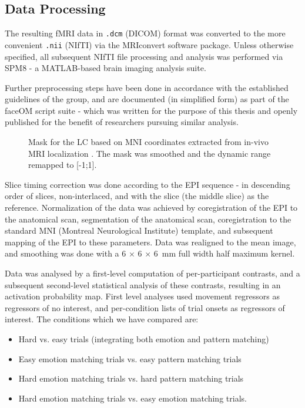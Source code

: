 	\subsection{Data Processing}\label{sec:m_fmri_dp}
	    The resulting fMRI data in \colorbox{vlg}{\texttt{.dcm}} (DICOM) format was converted to the more convenient \colorbox{vlg}{\texttt{.nii}} (NIfTI) via the MRIconvert \citep{MRIconvert} software package.
	    Unless otherwise specified, all subsequent NIfTI file processing and analysis was performed via SPM8 \citep{spm} - a MATLAB\textsuperscript{\small\textregistered}-based brain imaging analysis suite.
	    
	    Further preprocessing steps have been done in accordance with the established guidelines of the group, and are documented (in simplified form) as part of the faceOM script suite \citep{faceOM} - which was written for the purpose of this thesis and openly published for the benefit of researchers pursuing similar analysis.
	    
	    \begin{wrapfigure}{r}{0.55\textwidth}
		\centering
		\vspace{-0.7cm}
		\caption{Mask for the LC based on MNI coordinates extracted from in-vivo MRI localization \citep{Keren2009}. The mask was smoothed and the dynamic range remapped to [-1;1].}
		\label{fig:m_fmri_dp}
		\vspace{-1.1cm}
	    \end{wrapfigure}

	    Slice timing correction was done according to the EPI sequence - in descending order of slices, non-interlaced, and with the  slice (the middle slice) as the reference.
	    Normalization of the data was achieved by coregistration of the EPI to the anatomical scan, segmentation of the anatomical scan, coregistration to the standard MNI (Montreal Neurological Institute) template, and subsequent mapping of the EPI to these parameters. 
	    Data was realigned to the mean image, and smoothing was done with a 6 $\times$ 6 $\times$ \SI{6}{\milli\metre} full width half maximum kernel.
	    
	    Data was analysed by a first-level computation of per-participant contrasts, and a subsequent second-level statistical analysis of these contrasts, resulting in an activation probability map.
	    First level analyses used movement regressors as regressors of no interest, and per-condition lists of trial onsets as regressors of interest.
	    The conditions which we have compared are:
	    \begin{itemize}
		\item Hard vs. easy trials (integrating both emotion and pattern matching)
		\item Easy emotion matching trials vs. easy pattern matching trials
		\item Hard emotion matching trials vs. hard pattern matching trials
		\item Hard emotion matching trials vs. easy emotion matching trials.
	    \end{itemize} 

